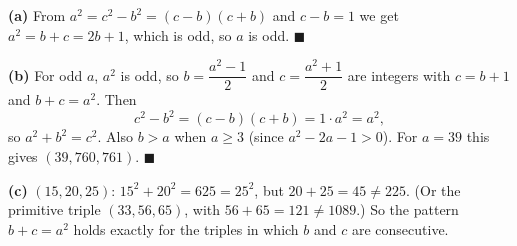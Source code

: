 \textbf{(a)} From $a^2=c^2-b^2=(c-b)(c+b)$ and $c-b=1$ we get $a^2=b+c=2b+1$, which is odd, so $a$ is odd. $\blacksquare$

\textbf{(b)} For odd $a$, $a^2$ is odd, so $b=\dfrac{a^2-1}{2}$ and $c=\dfrac{a^2+1}{2}$ are integers with $c=b+1$ and $b+c=a^2$. Then
\[
c^2-b^2=(c-b)(c+b)=1\cdot a^2=a^2,
\]
so $a^2+b^2=c^2$. Also $b>a$ when $a\ge3$ (since $a^2-2a-1>0$). For $a=39$ this gives $(39,760,761)$. $\blacksquare$

\textbf{(c)} $(15,20,25)$: $15^2+20^2=625=25^2$, but $20+25=45\ne225$. (Or the primitive triple $(33,56,65)$, with $56+65=121\ne1089$.) So the pattern $b+c=a^2$ holds exactly for the triples in which $b$ and $c$ are consecutive.
